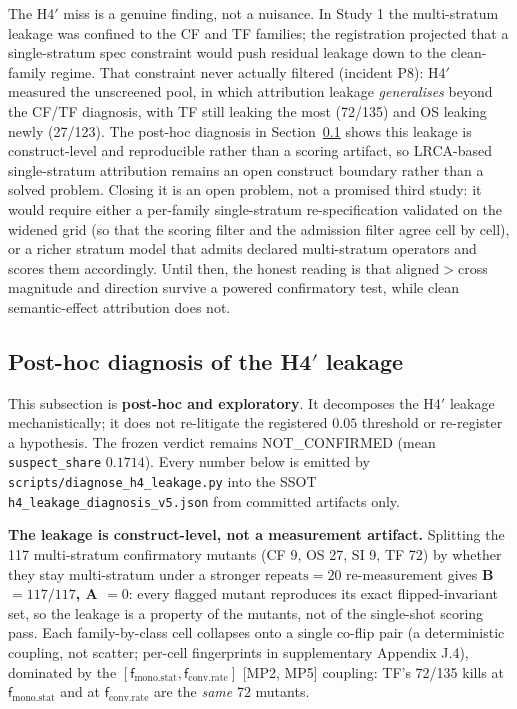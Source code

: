 \documentclass[manuscript,screen,review]{acmart}
\begin{document}
The H4\('\) miss is a genuine finding, not a nuisance. In Study 1 the
multi-stratum leakage was confined to the CF and TF families; the
registration projected that a single-stratum spec constraint would push
residual leakage down to the clean-family regime. That constraint never
actually filtered (incident P8): H4\('\) measured the unscreened pool, in
which attribution leakage \emph{generalises} beyond the CF/TF diagnosis,
with TF still leaking the most (72/135) and OS leaking newly (27/123). The
post-hoc diagnosis in Section~\ref{study2-h4-diagnosis} shows this leakage is
construct-level and reproducible rather than a scoring artifact, so
LRCA-based single-stratum attribution remains an
open construct boundary rather than a solved problem. Closing it is an
open problem, not a promised third study: it would require either a
per-family single-stratum re-specification validated on the widened grid
(so that the scoring filter and the admission filter agree cell by cell),
or a richer stratum model that admits declared multi-stratum operators
and scores them accordingly. Until then, the honest reading is that
aligned\(>\)cross magnitude and direction survive a powered confirmatory
test, while clean semantic-effect attribution does not.

\subsection{Post-hoc diagnosis of the H4\('\) leakage}\label{study2-h4-diagnosis}

This subsection is \textbf{post-hoc and exploratory}. It decomposes the
H4\('\) leakage mechanistically; it does not re-litigate the registered
\(0.05\) threshold or re-register a hypothesis. The frozen verdict remains
NOT\_CONFIRMED (mean \texttt{suspect\_share} \(0.1714\)). Every number below
is emitted by \texttt{scripts/diagnose\_h4\_leakage.py} into the SSOT
\texttt{h4\_leakage\_diagnosis\_v5.json} from committed artifacts only.

\textbf{The leakage is construct-level, not a measurement artifact.} Splitting
the 117 multi-stratum confirmatory mutants (CF 9, OS 27, SI 9, TF 72) by whether
they stay multi-stratum under a stronger $\mathrm{repeats}=20$ re-measurement
gives \textbf{B $= 117/117$, A $= 0$}: every flagged mutant reproduces its exact
flipped-invariant set, so the leakage is a property of the mutants, not of the
single-shot scoring pass. Each family-by-class cell collapses onto a single
co-flip pair (a deterministic coupling, not scatter; per-cell fingerprints in
supplementary Appendix J.4), dominated by the
$[\mathsf{f}_{\mathrm{mono.stat}},\mathsf{f}_{\mathrm{conv.rate}}]$ [MP2, MP5]
coupling: TF's 72/135 kills at $\mathsf{f}_{\mathrm{mono.stat}}$ and at
$\mathsf{f}_{\mathrm{conv.rate}}$ are the \emph{same} 72 mutants.
\end{document}
